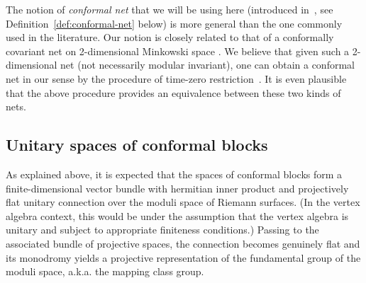 \documentclass[a4paper,10pt,leqno]{amsart}
\theoremstyle{plain}
\theoremstyle{definition}
\theoremstyle{remark}
\DeclareRobustCommand{\SkipTocEntry}[5]{}
\begin{document}
The notion of \emph{conformal net} that we will be using here (introduced in~\cite{BDH(nets)}, see Definition~\ref{def:conformal-net} below)
is more general than the one commonly used in the literature.
Our notion 
is closely related to that of a conformally covariant net on 2-dimensional Minkowski space \cite{Brunetti-Guido-Longo(1993modular+duality-in-CQFT)}.
We believe that given such a 2-dimensional net (not necessarily modular invariant),
one can obtain a conformal net in our sense by the procedure of  time-zero restriction~\cite[Sec.4]{Kawahigashi-Longo-Mueger(2001multi-interval)}.
It is even plausible that the above procedure provides an equivalence between these two kinds of nets.





\subsection*{Unitary spaces of conformal blocks}
As explained above, it is expected that the spaces of conformal blocks form a finite-dimensional vector bundle with hermitian inner product and projectively flat unitary connection over the moduli space of Riemann surfaces.
(In the vertex algebra context, this would be under the assumption that the vertex algebra is unitary \cite{Dong-Lin(Unitary-vertex-operator-algebras)} and subject to appropriate finiteness conditions.)
Passing to the associated bundle of projective spaces, the connection becomes genuinely flat and
its monodromy yields a projective representation of the fundamental group of the moduli space, a.k.a. the mapping class group.
\end{document}
